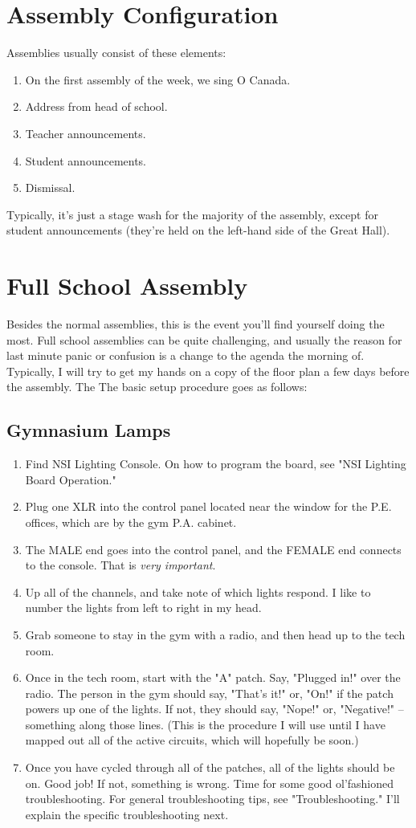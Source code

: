 \documentclass[letterpaper,10pt,oneside,headsepline]{scrreprt}
\begin{document}
\section{Assembly Configuration}
Assemblies usually consist of these elements:
\begin{enumerate}
\item On the first assembly of the week, we sing O Canada.
\item Address from head of school.
\item Teacher announcements.
\item Student announcements. 
\item Dismissal.
\end{enumerate} 
Typically, it's just a stage wash for the majority of the assembly, except for student announcements (they're held on the left-hand side of the Great Hall).

\section{Full School Assembly}
Besides the normal assemblies, this is the event you'll find yourself doing the most. Full school assemblies can be quite challenging, and usually the reason for last minute panic or confusion is a change to the agenda the morning of. Typically, I will try to get my hands on a copy of the floor plan a few days before the assembly. The  The basic setup procedure goes as follows:
\subsection{Gymnasium Lamps}
\begin{enumerate}
\item Find NSI Lighting Console. On how to program the board, see "NSI Lighting Board Operation."
\item Plug one XLR into the control panel located near the window for the P.E. offices, which are by the gym P.A. cabinet.
\item The MALE end goes into the control panel, and the FEMALE end connects to the console. That is \textit{very important}.
\item Up all of the channels, and take note of which lights respond. I like to number the lights from left to right in my head.
\item Grab someone to stay in the gym with a radio, and then head up to the tech room.
\item Once in the tech room, start with the "A" patch. Say, "Plugged in!" over the radio. The person in the gym should say, "That's it!" or, "On!" if the patch powers up one of the lights. If not, they should say, "Nope!" or, "Negative!" -- something along those lines. (This is the procedure I will use until I have mapped out all of the active circuits, which will hopefully be soon.)
\item Once you have cycled through all of the patches, all of the lights should be on. Good job! If not, something is wrong. Time for some good ol'fashioned troubleshooting. For general troubleshooting tips, see "Troubleshooting." I'll explain the specific troubleshooting next.
\end{enumerate}
\end{document}
